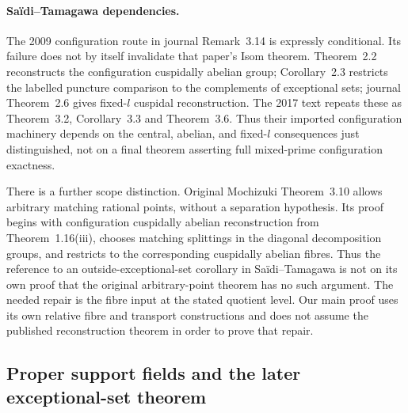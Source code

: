 \documentclass[11pt,a4paper]{article}
\begin{document}
\paragraph{Sa\"idi--Tamagawa dependencies.}
The 2009 configuration route in journal Remark~3.14 is expressly
conditional. Its failure does not by itself invalidate that paper's
Isom theorem. Theorem~2.2 reconstructs the configuration cuspidally
abelian group; Corollary~2.3 restricts the labelled puncture comparison
to the complements of exceptional sets; journal Theorem~2.6 gives
fixed-$l$ cuspidal reconstruction. The 2017 text repeats these as
Theorem~3.2, Corollary~3.3 and Theorem~3.6. Thus their imported
configuration machinery depends on the central, abelian, and fixed-$l$
consequences just distinguished, not on a final theorem asserting
full mixed-prime configuration exactness.

There is a further scope distinction. Original Mochizuki Theorem~3.10
allows arbitrary matching rational points, without a separation
hypothesis. Its proof begins with configuration cuspidally abelian
reconstruction from Theorem~1.16(iii), chooses matching splittings in
the diagonal decomposition groups, and restricts to the corresponding
cuspidally abelian fibres. Thus the reference to an outside-exceptional-set
corollary in Sa\"idi--Tamagawa is not on its own proof that the original
arbitrary-point theorem has no such argument. The needed repair is the
fibre input at the stated quotient level. Our main proof uses its own
relative fibre and transport constructions and does not assume the
published reconstruction theorem in order to prove that repair.
\citep{LA_ST2009,LA_ST2017,LA_Mochizuki2007}

\subsection{Proper support fields and the later exceptional-set theorem}
\end{document}
